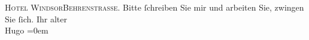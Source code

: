 \begin{ledgroupsized}[t]{13cm}
           \pstart
           \centering{}\textsc{Hotel Windsor\hspace*{1em}Behrenstrasse}.\pend
           \pstart
           \noindent{}Bitte ſchreiben Sie mir und arbeiten Sie, zwingen
                    Sie ſich.\pend
           \pstart
           Ihr alter{\\[\baselineskip]}\spacefill\mbox{Hugo}\pend
           \leftskip=0em{}\endnumbering{}\end{ledgroupsized}  \newcommand{\dateiname}{L00907}\newcommand{\titel}{Hugo von Hofmannsthal an Arthur Schnitzler, [20. 3. 1899]}\newcommand{\editorInnen}{Martin Anton Müller und Gerd-Hermann Susen}
            \footnotesize
\begin{ledgroupsized}[t]{11.5cm}
\end{ledgroupsized}
         
      